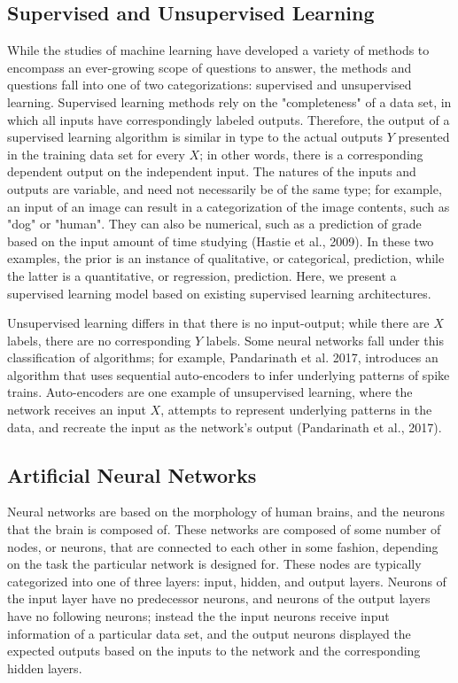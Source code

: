 \documentclass[11pt,titlepage]{article}
\begin{document}
\subsection{Supervised and Unsupervised Learning}
While the studies of machine learning have developed a variety of methods to encompass an ever-growing scope of questions to answer, the methods and questions fall into one of two categorizations: supervised and unsupervised learning. Supervised learning methods rely on the "completeness" of a data set, in which all inputs have correspondingly labeled outputs. Therefore, the output of a supervised learning algorithm is similar in type to the actual outputs $Y$ presented in the training data set for every $X$; in other words, there is a corresponding dependent output on the independent input. The natures of the inputs and outputs are variable, and need not necessarily be of the same type; for example, an input of an image can result in a categorization of the image contents, such as "dog" or "human". They can also be numerical, such as a prediction of grade based on the input amount of time studying (Hastie et al., 2009). In these two examples, the prior is an instance of qualitative, or categorical, prediction, while the latter is a quantitative, or regression, prediction. Here, we present a supervised learning model based on existing supervised learning architectures.\par

Unsupervised learning differs in that there is no input-output; while there are $X$ labels, there are no corresponding $Y$ labels. Some neural networks fall under this classification of algorithms; for example, Pandarinath et al. 2017, introduces an algorithm that uses sequential auto-encoders to infer underlying patterns of spike trains. Auto-encoders are one example of unsupervised learning, where the network receives an input $X$, attempts to represent underlying patterns in the data, and recreate the input as the network's output (Pandarinath et al., 2017).

\subsection{Artificial Neural Networks}
Neural networks are based on the morphology of human brains, and the neurons that the brain is composed of. These networks are composed of some number of nodes, or neurons, that are connected to each other in some fashion, depending on the task the particular network is designed for. These nodes are typically categorized into one of three layers: input, hidden, and output layers. Neurons of the input layer have no predecessor neurons, and neurons of the output layers have no following neurons; instead the the input neurons receive input information of a particular data set, and the output neurons displayed the expected outputs based on the inputs to the network and the corresponding hidden layers.\par
\end{document}

